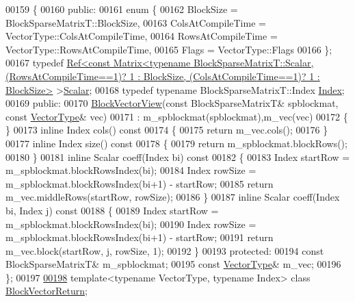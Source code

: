 \begin{DoxyCode}
00159 \{
00160   \textcolor{keyword}{public}:
00161     \textcolor{keyword}{enum} \{
00162       BlockSize = BlockSparseMatrixT::BlockSize,
00163       ColsAtCompileTime = VectorType::ColsAtCompileTime,
00164       RowsAtCompileTime = VectorType::RowsAtCompileTime,
00165       Flags = VectorType::Flags
00166     \};
00167     \textcolor{keyword}{typedef} 
      \hyperlink{group___core___module_class_eigen_1_1_ref}{Ref<const Matrix<typename BlockSparseMatrixT::Scalar, (RowsAtCompileTime==1)? 1 : BlockSize,
       (ColsAtCompileTime==1)? 1 : BlockSize>}
       >\hyperlink{group___core___module_class_eigen_1_1_ref}{Scalar};
00168     \textcolor{keyword}{typedef} \textcolor{keyword}{typename} BlockSparseMatrixT::Index \hyperlink{namespace_eigen_a62e77e0933482dafde8fe197d9a2cfde}{Index};
00169   \textcolor{keyword}{public}:
00170     \hyperlink{class_eigen_1_1_block_vector_view}{BlockVectorView}(\textcolor{keyword}{const} BlockSparseMatrixT& spblockmat, \textcolor{keyword}{const} 
      \hyperlink{struct_vector_type}{VectorType}& vec)
00171     : m\_spblockmat(spblockmat),m\_vec(vec)
00172     \{ \}
00173     \textcolor{keyword}{inline} Index cols()\textcolor{keyword}{ const}
00174 \textcolor{keyword}{    }\{
00175       \textcolor{keywordflow}{return} m\_vec.cols();
00176     \}
00177     \textcolor{keyword}{inline} Index size()\textcolor{keyword}{ const}
00178 \textcolor{keyword}{    }\{
00179       \textcolor{keywordflow}{return} m\_spblockmat.blockRows();
00180     \}
00181     \textcolor{keyword}{inline} Scalar coeff(Index bi)\textcolor{keyword}{ const}
00182 \textcolor{keyword}{    }\{
00183       Index startRow = m\_spblockmat.blockRowsIndex(bi);
00184       Index rowSize = m\_spblockmat.blockRowsIndex(bi+1) - startRow;
00185       \textcolor{keywordflow}{return} m\_vec.middleRows(startRow, rowSize);
00186     \}
00187     \textcolor{keyword}{inline} Scalar coeff(Index bi, Index j)\textcolor{keyword}{ const}
00188 \textcolor{keyword}{    }\{
00189       Index startRow = m\_spblockmat.blockRowsIndex(bi);
00190       Index rowSize = m\_spblockmat.blockRowsIndex(bi+1) - startRow;
00191       \textcolor{keywordflow}{return} m\_vec.block(startRow, j, rowSize, 1);
00192     \}
00193   \textcolor{keyword}{protected}:
00194     \textcolor{keyword}{const} BlockSparseMatrixT& m\_spblockmat;
00195     \textcolor{keyword}{const} \hyperlink{struct_vector_type}{VectorType}& m\_vec;
00196 \};
00197 
\hyperlink{class_eigen_1_1_block_vector_return}{00198} \textcolor{keyword}{template}<\textcolor{keyword}{typename} VectorType, \textcolor{keyword}{typename} Index> \textcolor{keyword}{class }\hyperlink{class_eigen_1_1_block_vector_return}{BlockVectorReturn};

\end{DoxyCode}
